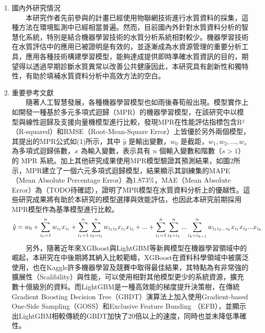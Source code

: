 \documentclass[12pt,a4paper]{article}
\begin{document}
\begin{enumerate}
\begin{enumerate}[label=\arabic*.]
\begin{enumerate}[label=1-5-\arabic*.]
    \end{enumerate}
\item 國內外研究情況\\
　　本研究作者先前參與的計畫已經使用物聯網技術進行水質資料的採集，這種方法在環境監測中已經相當普遍。然而，目前國內外針對水質資料分析的智慧化系統，特別是結合機器學習技術的水質分析系統相對較少。機器學習技術在水質評估中的應用已被證明是有效的，並逐漸成為水資源管理的重要分析工具\cite{ref4}，應用各種技術構建學習模型，能夠達成提供即時準確水質資訊的目的，期望得以透過早期診斷水質異常以改善公共健康\cite{ref5}因此，本研究具有創新性和獨特性，有助於填補水質資料分析中高效方法的空白。
\item 重要參考文獻\\
　　隨著人工智慧發展，各種機器學習模型也如雨後春筍般出現。模型實作上如開發一種基於多元多項式迴歸（MPR）的機器學習模型，在該研究中以模型與線性迴歸及支援向量機模型進行比較，發現MPR在性能評估指標包含R²（R-squared）和RMSE（Root-Mean-Square Error）上皆優於另外兩個模型\cite{ref6}，其提出的MPR公式如(1)所示，其中 $\hat{y}$ 是輸出變數，$w_0$ 是截距，$w_1, w_2, \ldots, w_s$ 為多項式迴歸係數，$x$ 為輸入變數，表示具有 $n$ 個輸入變數和階數（$s > 1$）的 MPR 系統。加上其他研究成果使用MPR模型驗證其預測結果\cite{ref7}，如圖2所示，MPR建立了一個六元多項式迴歸模型，結果顯示其訓練集的MAPE（Mean Absolute Percentage Error）為1.873\%，MAE（Mean Absolute Error）為（TODO待確認），證明了MPR模型在水質資料分析上的優越性\cite{ref8}。這些研究成果將有助於本研究的模型選擇與效能評估，也因此本研究前期採用MPR模型作為基準模型進行比較。\\
    \begin{equation}
        \hat{y} = w_0 + \sum_{i_1=1}^{n} w_{i_1} x_{i_1} + \sum_{i_1=1}^{n} \sum_{i_2=i_1}^{n} w_{i_1 i_2} x_{i_1} x_{i_2} + ... \\
        + \sum_{i_1=1}^{n} \sum_{i_2=i_1}^{n} ... \sum_{i_k=i_{k-1}}^{n} w_{i_1 i_2 ... i_k} x_{i_1} x_{i_2} ... x_{i_k}
    \end{equation}
　　另外，隨著近年來XGBoost與LightGBM等新興模型在機器學習領域中的崛起，本研究在中後期將其納入比較範疇，XGBoost在資料科學領域中被廣泛使用，也在Kaggle許多機器學習及競賽中取得最佳結果，其特點為有非常強的擴展性（Scalibility）與性能，可以使用相對其他模型更少的系統資源，擴充數十億級別的資料\cite{ref9}。而LightGBM是一種高效能的梯度提升決策樹，在傳統Gradient Boosting Decision Tree（GBDT）演算法上加入使用Gradient-based One-Side Sampling（GOSS）和Exclusive Feature Bunding （EFB），並顯示出LightGBM相較傳統的GBDT加快了20倍以上的速度，同時也並未降低準確性\cite{ref10}。\\

\end{enumerate}
\end{enumerate}
\end{document}
